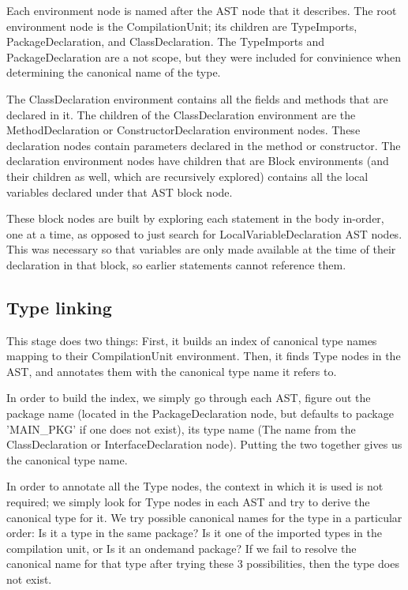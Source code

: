 \documentclass[12pt]{article}
\begin{document}
Each environment node is named after the AST node that it describes.  The root
environment node is the CompilationUnit;  its children are TypeImports,
PackageDeclaration, and ClassDeclaration.  The TypeImports and
PackageDeclaration are a not scope, but they were included for
convinience when determining the canonical name of the type.

The ClassDeclaration environment contains all the fields and methods that are
declared in it.
The children of the ClassDeclaration environment are the MethodDeclaration or
ConstructorDeclaration environment nodes.  These declaration nodes contain
parameters declared in the method or constructor.  The declaration environment
nodes have children that are Block environments (and their children as well,
which are recursively explored) contains all the local variables declared under
that AST block node.

These block nodes are built by exploring each statement in the body in-order, one at a
time, as opposed to just search for LocalVariableDeclaration AST nodes.  This
was necessary so that variables are only made available at the time of their
declaration in that block, so earlier statements cannot reference them.

\subsection{Type linking}
This stage does two things:  First, it builds an index of canonical type names
mapping to their CompilationUnit environment.  Then, it finds Type nodes in the
AST, and annotates them with the canonical type name it refers to.

In order to build the index, we simply go through each AST, figure out the
package name (located in the PackageDeclaration node, but defaults to package
'MAIN_PKG' if one does not exist), its type name (The name from the
ClassDeclaration or InterfaceDeclaration node).  Putting the two together gives
us the canonical type name.

In order to annotate all the Type nodes, the context in which it is used is not
required;  we simply look for Type nodes in each AST and try to derive the
canonical type for it.  We try possible canonical names for the type in a
particular order:  Is it a type in the same package?  Is it one of the imported
types in the compilation unit, or Is it an ondemand package?  If we fail to
resolve the canonical name for that type after trying these 3 possibilities,
then the type does not exist.
\end{document}
